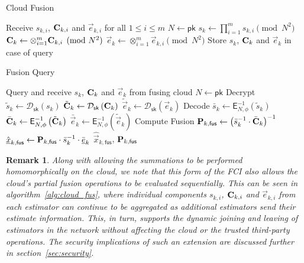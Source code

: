 \documentclass[letterpaper, 10 pt, conference]{ieeeconf}
\newtheorem{remark}{Remark}
\begin{document}
\begin{algorithm}[htbp]
\caption{Cloud Fusion}\label{alg:cloud_fus}
\begin{algorithmic}[1]
    \State Receive $s_{k,i}$, ${{\mathbf{C}}}_{k,i}$ and $\vec{e}_{k,i}$ for all $1\leq i \leq m$
    \State $N \gets \mathsf{pk}$
    \State $s_k \gets \prod_{i=1}^{m} s_{k,i} \pmod{N^2}$
    \State ${{\mathbf{C}}}_k \gets \otimes_{i=1}^{m} {{\mathbf{C}}}_{k,i} \pmod{N^2}$
    \State $\vec{e}_k \gets \otimes_{i=1}^{m} \vec{e}_{k,i} \pmod{N^2}$
    \State Store $s_k$, ${{\mathbf{C}}}_k$ and $\vec{e}_k$ in case of query
    \EndProcedure
\end{algorithmic}
\end{algorithm}
\begin{algorithm}[htbp]
\caption{Fusion Query}\label{alg:fus_query}
\begin{algorithmic}[1]
    \State Query and receive $s_k$, ${{\mathbf{C}}}_k$ and $\vec{e}_k$ from fusing cloud
    \State $N \gets \mathsf{pk}$
    \LineComment Decrypt
    \State $\tilde{s}_k \gets \mathcal{D}_{\mathsf{sk}}\left(s_k\right)$
    \State $\tilde{{{\mathbf{C}}}}_k \gets \mathcal{D}_{\mathsf{sk}}\left({{\mathbf{C}}}_k\right)$
    \State $\tilde{\vec{e}}_k \gets \mathcal{D}_{\mathsf{sk}}\left(\vec{e}_k\right)$
    \LineComment Decode
    \State $\bar{s}_k \gets \mathsf{E}^{-1}_{N,\phi}\left(\tilde{s}_k\right)$
    \State $\bar{{{\mathbf{C}}}}_k \gets \mathsf{E}^{-1}_{N,\phi}\left(\tilde{{{\mathbf{C}}}}_k\right)$
    \State $\bar{\vec{e}}_k \gets \mathsf{E}^{-1}_{N,\phi}\left(\tilde{\vec{e}}_k\right)$
    \LineComment Compute Fusion
    \State ${{\mathbf{P}}}_{k,\mathsf{fus}} \gets \left(\bar{s}_k^{-1} \cdot \bar{{{\mathbf{C}}}}_k\right)^{-1}$
    \State $\hat{{\underline{x}}}_{k,\mathsf{fus}} \gets {\ensuremath{{\mathbf{P}}}}_{k,\mathsf{fus}} \cdot \bar{s}_k^{-1} \cdot \bar{{\underline{e}}}_k$
    \State \Return $\hat{\vec{x}}_{k,\mathsf{fus}}$, ${{\mathbf{P}}}_{k,\mathsf{fus}}$
    \EndProcedure
\end{algorithmic}
\end{algorithm}

\begin{remark}\label{rem:seq_extension}
    Along with allowing the summations to be performed homomorphically on the cloud, we note that this form of the FCI also allows the cloud's partial fusion operations to be evaluated sequentially. This can be seen in algorithm~\ref{alg:cloud_fus}, where individual components $s_{k,i}$, ${{\mathbf{C}}}_{k,i}$ and $\vec{e}_{k,i}$ from each estimator can continue to be aggregated as additional estimators send their estimate information. This, in turn, supports the dynamic joining and leaving of estimators in the network without affecting the cloud or the trusted third-party operations. The security implications of such an extension are discussed further in section~\ref{sec:security}.
\end{remark}
\end{document}
